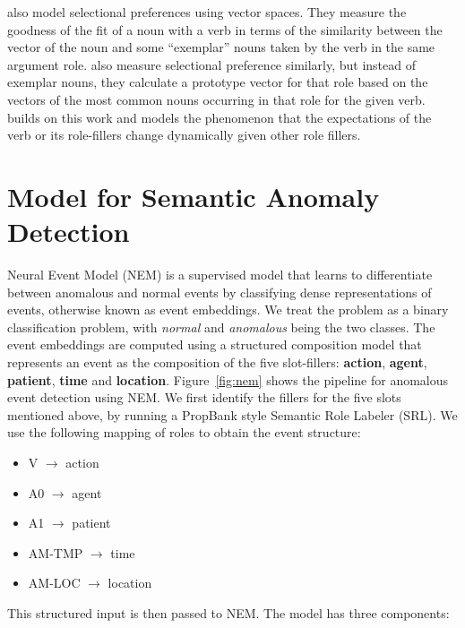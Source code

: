 \cite{erk2010flexible} also model selectional preferences using vector spaces.  
They measure the 
goodness of the fit of a noun with a verb in terms of the similarity between the 
vector of the noun and 
some ``exemplar'' nouns taken by the verb in the same argument role.  
\cite{baroni2010distributional} 
also measure selectional preference similarly, but instead of exemplar nouns, 
they calculate a 
prototype vector for that role based on the vectors of the most common nouns 
occurring in that 
role for the given verb.  \cite{lenci2011composing} builds on this work and 
models the phenomenon
that the expectations of the verb or its role-fillers change dynamically given 
other role fillers.



\section{Model for Semantic Anomaly Detection}
Neural Event Model (NEM) is a supervised model that learns to differentiate between anomalous and
normal events by 
classifying dense representations of events, otherwise known as event embeddings. We treat the problem as a binary classification problem, with
\textit{normal} and \textit{anomalous} being the two classes.
The event embeddings are computed using a structured composition model
that represents an event as the composition of the five slot-fillers: \textbf{action},
\textbf{agent}, \textbf{patient}, \textbf{time} and \textbf{location}.
Figure~\ref{fig:nem} shows the pipeline for anomalous event detection using NEM. We
first identify the fillers for the five slots mentioned above, by running a PropBank \citep{palmer2005proposition}
style Semantic Role Labeler (SRL). We use the following mapping of roles to obtain the event structure:
\begin{itemize}
 \item V $\rightarrow$ action
 \item A0 $\rightarrow$ agent
 \item A1 $\rightarrow$ patient
 \item AM-TMP $\rightarrow$ time
 \item AM-LOC $\rightarrow$ location
\end{itemize}
This structured input is then passed to NEM. The model has three components:

